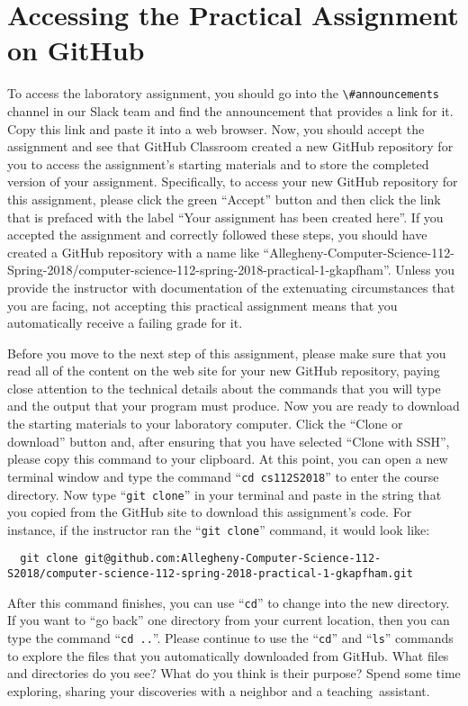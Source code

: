 \documentclass[11pt]{article}
\newcommand{\command}[1]{``\lstinline{#1}''}
\newcommand{\channel}[1]{\lstinline{#1}}
\newcommand{\step}[1]{``{#1}''}
\begin{document}
\section*{Accessing the Practical Assignment on GitHub}

To access the laboratory assignment, you should go into the
\channel{\#announcements} channel in our Slack team and find the announcement
that provides a link for it. Copy this link and paste it into a web browser.
Now, you should accept the assignment and see that GitHub Classroom created a
new GitHub repository for you to access the assignment's starting materials and
to store the completed version of your assignment. Specifically, to access your
new GitHub repository for this assignment, please click the green ``Accept''
button and then click the link that is prefaced with the label ``Your assignment
has been created here''. If you accepted the assignment and correctly followed
these steps, you should have created a GitHub repository with a name like
``Allegheny-Computer-Science-112-Spring-2018/computer-science-112-spring-2018-practical-1-gkapfham''.
Unless you provide the instructor with documentation of the extenuating
circumstances that you are facing, not accepting this practical assignment means
that you automatically receive a failing grade for it.

Before you move to the next step of this assignment, please make sure that you
read all of the content on the web site for your new GitHub repository, paying
close attention to the technical details about the commands that you will type
and the output that your program must produce. Now you are ready to download the
starting materials to your laboratory computer. Click the ``Clone or download''
button and, after ensuring that you have selected ``Clone with SSH'', please
copy this command to your clipboard. At this point, you can open a new terminal
window and type the command \command{cd cs112S2018} to enter the course
directory. Now type \command{git clone} in your terminal and paste in the string
that you copied from the GitHub site to download this assignment's code. For
instance, if the instructor ran the \command{git clone} command, it would look
like:

\begin{lstlisting}
  git clone git@github.com:Allegheny-Computer-Science-112-S2018/computer-science-112-spring-2018-practical-1-gkapfham.git
\end{lstlisting}

After this command finishes, you can use \command{cd} to change into the new directory. If you want to \step{go back}
one directory from your current location, then you can type the command \command{cd ..}. Please continue to use the
\command{cd} and \command{ls} commands to explore the files that you automatically downloaded from GitHub. What files
and directories do you see? What do you think is their purpose? Spend some time exploring, sharing your discoveries with
a neighbor and a \mbox{teaching assistant}.
\end{document}
